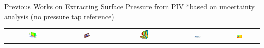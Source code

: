 \documentclass{beamer}
\begin{document}
\begin{frame}{Previous Works on Extracting Surface Pressure from PIV}
    \footnotesize{*based on uncertainty analysis (no pressure tap reference)}
    \begin{tabular}{ccccc}
        \includegraphics[width = 0.17\textwidth]{figs/for_pres/0012_tagliabue.png} &
        \includegraphics[width = 0.15\textwidth]{figs/for_pres/sphere.png} &
        \includegraphics[width = 0.13\textwidth]{figs/for_pres/cyclist.png} &
        \includegraphics[width = 0.20\textwidth]{figs/for_pres/bullet_step.png} &
        \includegraphics[width = 0.16\textwidth]{figs/for_pres/0012_ragni.png} 
    \end{tabular}
\end{frame}
\end{document}
